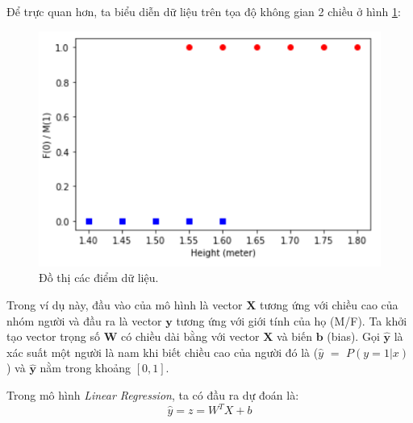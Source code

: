 Để trực quan hơn, ta biểu diễn dữ liệu trên tọa độ không gian 2 chiều ở hình \ref{fig:sec2ex1}:
\begin{figure}[!ht]
    \centering
    \includegraphics[scale=0.5]{chapter02/figure/example1.png}
    \caption{Đồ thị các điểm dữ liệu.}
    \label{fig:sec2ex1}
\end{figure}

Trong ví dụ này, đầu vào của mô hình là vector $\mathbf{X}$ tương ứng với chiều cao của nhóm người và đầu ra là vector $\mathbf{y}$ tương ứng với giới tính của họ (M/F). Ta khởi tạo vector trọng số $\mathbf{W}$ có chiều dài bằng với vector $\mathbf{X}$ và biến $\mathbf{b}$ (bias). Gọi $\mathbf{\hat{y}}$ là xác suất một người là nam khi biết chiều cao của người đó là ($\hat{y}$ $=$ $P(y=1|x)$) và $\mathbf{\hat{y}}$ nằm trong khoảng $[0, 1]$.


Trong mô hình \textit{Linear Regression}, ta có đầu ra dự đoán là:
\begin{equation*}
    \hat{y} = z = W^TX + b
\end{equation*}

